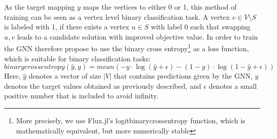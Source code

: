 \documentclass[draft,final]{vutinfth} %
\begin{document}
As the target mapping $y$ maps the vertices to either 0 or 1, this method of training can be seen as a vertex level binary classification task. A vertex $v \in V \setminus S$ is labeled with 1, if there exists a vertex $u \in S$ with label 0 such that swapping $u, v$ leads to a candidate solution with improved objective value. 
In order to train the GNN therefore propose to use the binary cross entropy\footnote{More precisely, we use Flux.jl's logitbinarycrossentropy function, which is mathematically equivalent, but more numerically stable} as a loss function, which is suitable for binary classification tasks:
\[
    \mathit{binarycrossentropy}(\hat{y}, y) = \mathit{mean}(-y \cdot \log(\hat{y} + \epsilon) - (1 - y) \cdot \log(1 - \hat{y} + \epsilon))    
\]
Here, $\hat{y}$ denotes a vector of size $|V|$ that contains predictions given by the GNN, $y$ denotes the target values obtained as previously described, and $\epsilon$ denotes a small positive number that is included to avoid infinity. 
\end{document}
